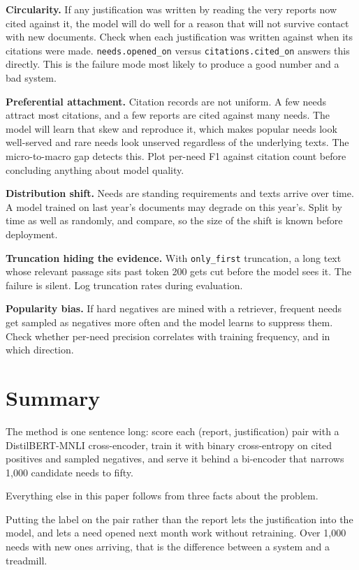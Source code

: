 \documentclass[11pt]{article}
\begin{document}
\textbf{Circularity.} If any justification was written by reading the very
reports now cited against it, the model will do well for a reason that will not
survive contact with new documents. Check when each justification was written
against when its citations were made. \texttt{needs.opened\_on} versus
\texttt{citations.cited\_on} answers this directly. This is the failure mode
most likely to produce a good number and a bad system.

\textbf{Preferential attachment.} Citation records are not uniform. A few needs
attract most citations, and a few reports are cited against many needs. The
model will learn that skew and reproduce it, which makes popular needs look
well-served and rare needs look unserved regardless of the underlying texts. The
micro-to-macro gap detects this. Plot per-need F1 against citation count before
concluding anything about model quality.

\textbf{Distribution shift.} Needs are standing requirements and texts arrive
over time. A model trained on last year's documents may degrade on this year's.
Split by time as well as randomly, and compare, so the size of the shift is known
before deployment.

\textbf{Truncation hiding the evidence.} With \texttt{only\_first} truncation, a
long text whose relevant passage sits past token 200 gets cut before the model
sees it. The failure is silent. Log truncation rates during evaluation.

\textbf{Popularity bias.} If hard negatives are mined with a retriever, frequent
needs get sampled as negatives more often and the model learns to suppress them.
Check whether per-need precision correlates with training frequency, and in
which direction.

\section{Summary}

The method is one sentence long: score each (report, justification) pair with a
DistilBERT-MNLI cross-encoder, train it with binary cross-entropy on cited
positives and sampled negatives, and serve it behind a bi-encoder that narrows
1,000 candidate needs to fifty.

Everything else in this paper follows from three facts about the problem.

Putting the label on the pair rather than the report lets the justification into
the model, and lets a need opened next month work without retraining. Over 1,000
needs with new ones arriving, that is the difference between a system and a
treadmill.
\end{document}
